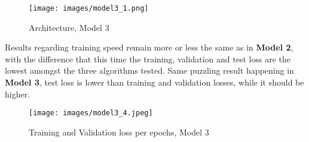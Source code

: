 \documentclass[11pt]{article}
\begin{document}
\begin{table}[H]
    \begin{center}
    \caption{Hyperparameters, Model 3} \label{tab:hyper_model3}

    \end{center}
\end{table}

\begin{figure}[H]
    \centering
    \texttt{[image: images/model3\_1.png]}
    \caption{Architecture, Model 3}
    \label{fig:architecture_model3}
\end{figure}

Results regarding training speed remain more or less the same as in \textbf{Model 2}, with the difference that this time the training, validation and test loss are the lowest amongst the three algorithms tested. Same puzzling result happening in \textbf{Model 3}, test loss is lower than training and validation losses, while it should be higher.

\begin{figure}[H]
    \centering
    \texttt{[image: images/model3\_4.jpeg]}
    \caption{Training and Validation loss per epochs, Model 3}
    \label{fig:model3_val}
\end{figure}
\end{document}

